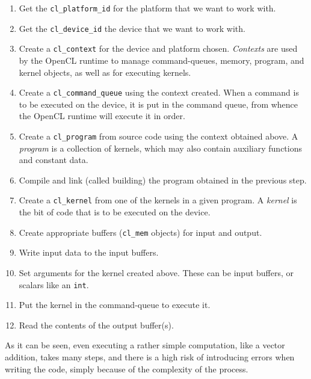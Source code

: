 \begin{enumerate}
  \item Get the \texttt{cl\_platform\_id} for the platform that we
    want to work with.
  \item Get the \texttt{cl\_device\_id} the device that we want to
    work with.
  \item Create a \texttt{cl\_context} for the device and platform
    chosen. \emph{Contexts} are used by the OpenCL runtime to manage
    command-queues, memory, program, and kernel objects, as well as
    for executing kernels.
  \item Create a \texttt{cl\_command\_queue} using the context
    created. When a command is to be executed on the device, it is put
    in the command queue, from whence the OpenCL runtime will
    execute it in order.
  \item Create a \texttt{cl\_program} from source code using the
    context obtained above. A \emph{program} is a collection of
    kernels, which may also contain auxiliary functions and constant
    data.
  \item Compile and link (called building) the program obtained in the
    previous step.
  \item Create a \texttt{cl\_kernel} from one of the kernels in a
    given program. A \emph{kernel} is the bit of code that is to be
    executed on the device.
  \item Create appropriate buffers (\texttt{cl\_mem} objects) for
    input and output.
  \item Write input data to the input buffers.
  \item Set arguments for the kernel created above. These can be input
    buffers, or scalars like an \texttt{int}.
  \item Put the kernel in the command-queue to execute it.
  \item Read the contents of the output buffer(s).
\end{enumerate}

As it can be seen, even executing a rather simple computation, like a
vector addition, takes many steps, and there is a high risk of
introducing errors when writing the code, simply because of the
complexity of the process.
